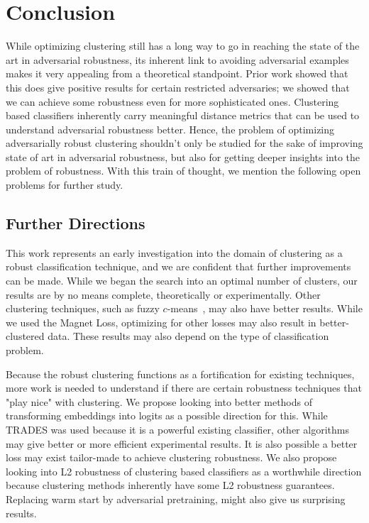 \section{Conclusion}

While optimizing clustering still has a long way to go in reaching the state of the art in adversarial robustness, its inherent link to avoiding adversarial examples makes it very appealing from a theoretical standpoint. Prior work showed that this does give positive results for certain restricted adversaries; we showed that we can achieve some robustness even for more sophisticated ones. Clustering based classifiers inherently carry meaningful distance metrics that can be used to understand adversarial robustness better. Hence, the problem of optimizing adversarially robust clustering shouldn't only be studied for the sake of improving state of art in adversarial robustness, but also for getting deeper insights into the problem of robustness. With this train of thought, we mention the following open problems for further study.


\subsection{Further Directions}

This work represents an early investigation into the domain of clustering as a robust classification technique, and we are confident that further improvements can be made. While we began the search into an optimal number of clusters, our results are by no means complete, theoretically or experimentally. Other clustering techniques, such as fuzzy $c$-means~\cite{Bezdek1984FCM}, may also have better results. While we used the Magnet Loss, optimizing for other losses may also result in better-clustered data. These results may also depend on the type of classification problem.

Because the robust clustering functions as a fortification for existing techniques, more work is needed to understand if there are certain robustness techniques that "play nice" with clustering. We propose looking into better methods of transforming embeddings into logits as a possible direction for this. While TRADES was used because it is a powerful existing classifier, other algorithms may give better or more efficient experimental results. It is also possible a better loss may exist tailor-made to achieve clustering robustness. We also propose looking into L2 robustness of clustering based classifiers as a worthwhile direction because clustering methods inherently have some L2 robustness guarantees. Replacing warm start by adversarial pretraining, might also give us surprising results.